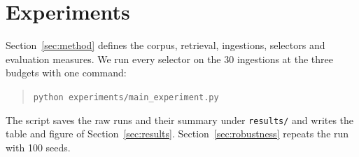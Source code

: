 \section{Experiments}

Section~\ref{sec:method} defines the corpus, retrieval, ingestions, selectors
and evaluation measures. We run every selector on the 30 ingestions at the
three budgets with one command:
\begin{quote}
\texttt{python experiments/main\_experiment.py}
\end{quote}
The script saves the raw runs and their summary under \texttt{results/} and
writes the table and figure of Section~\ref{sec:results}.
Section~\ref{sec:robustness} repeats the run with 100 seeds.
